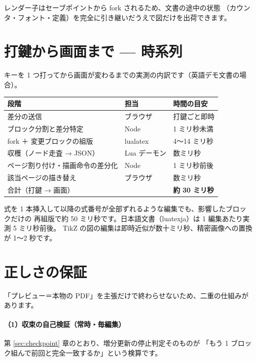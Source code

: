 \documentclass[11pt,a4paper]{ltjsarticle}
\begin{document}
レンダー子はセーブポイントから fork されるため、文書の途中の状態
（カウンタ・フォント・定義）を完全に引き継いだうえで図だけを出荷できます。

\section{打鍵から画面まで --- 時系列}

キーを 1 つ打ってから画面が変わるまでの実測の内訳です（英語デモ文書の場合）。

\begin{center}
\begin{tabular}{lll}
\toprule
段階 & 担当 & 時間の目安 \\
\midrule
差分の送信 & ブラウザ & 打鍵ごと即時 \\
ブロック分割と差分特定 & Node & 1 ミリ秒未満 \\
fork ＋ 変更ブロックの組版 & lualatex & 4〜14 ミリ秒 \\
収穫（ノード走査 → JSON） & Lua デーモン & 数ミリ秒 \\
ページ割り付け・描画命令の差分化 & Node & 1 ミリ秒前後 \\
該当ページの描き替え & ブラウザ & 数ミリ秒 \\
\midrule
合計（打鍵 → 画面） & & \textbf{約 30 ミリ秒} \\
\bottomrule
\end{tabular}
\end{center}

式を 1 本挿入して以降の式番号が全部ずれるような編集でも、影響したブロックだけの
再組版で約 50 ミリ秒です。日本語文書（luatexja）は 1 編集あたり実測 5 ミリ秒前後。
TikZ の図の編集は即時近似が数十ミリ秒、精密画像への置換が 1〜2 秒です。

\section{正しさの保証}

「プレビュー＝本物の PDF」を主張だけで終わらせないため、二重の仕組みがあります。

\paragraph{（1）収束の自己検証（常時・毎編集）}
第 \ref{sec:checkpoint} 章のとおり、増分更新の停止判定そのものが
「もう 1 ブロック組んで前回と完全一致するか」という検算です。
\end{document}
